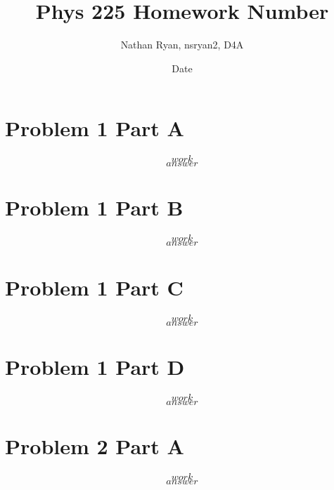 \documentclass{article}
\title{Phys 225 Homework Number}
\author{Nathan Ryan, nsryan2, D4A}
\date{Date}
\begin{document}
\maketitle

\section*{Problem 1 Part A}
\setcounter{equation}{0}
\begin{equation}
work
\end{equation}
\begin{equation*}
answer
\end{equation*}

\section*{Problem 1 Part B}
\setcounter{equation}{0}
\begin{equation}
work
\end{equation}
\begin{equation*}
answer
\end{equation*}

\section*{Problem 1 Part C}
\setcounter{equation}{0}
\begin{equation}
work
\end{equation}
\begin{equation*}
answer
\end{equation*}

\section*{Problem 1 Part D}
\setcounter{equation}{0}
\begin{equation}
work
\end{equation}
\begin{equation*}
answer
\end{equation*}


\pagebreak

\section*{Problem 2 Part A}
\setcounter{equation}{0}
\begin{equation}
work
\end{equation}
\begin{equation*}
answer
\end{equation*}
\end{document}
